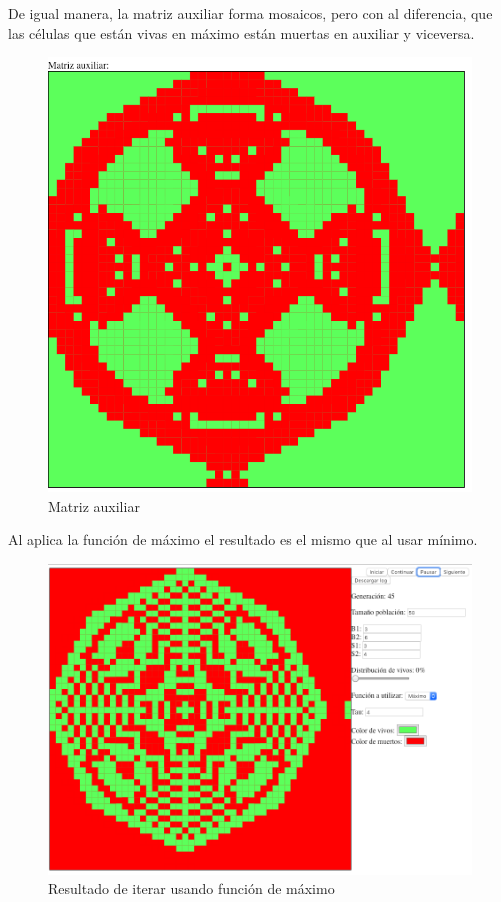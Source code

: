 	De igual manera, la matriz auxiliar forma mosaicos, pero con al diferencia, que las células que están vivas en máximo están muertas en auxiliar y viceversa.
	\begin{figure}[H]
		\begin{center}
			\includegraphics[scale=.3]{GOLM/img/regla3634-1-1.png}
			\caption{Matriz auxiliar}
			\label{fig:golm10}
		\end{center}
	\end{figure}


	Al aplica la función de máximo el resultado es el mismo que al usar mínimo.
	\begin{figure}[H]
		\begin{center}
			\includegraphics[scale=.3]{GOLM/img/regla3634-2.png}
			\caption{Resultado de iterar usando función de máximo}
			\label{fig:golm11}
		\end{center}
	\end{figure}

